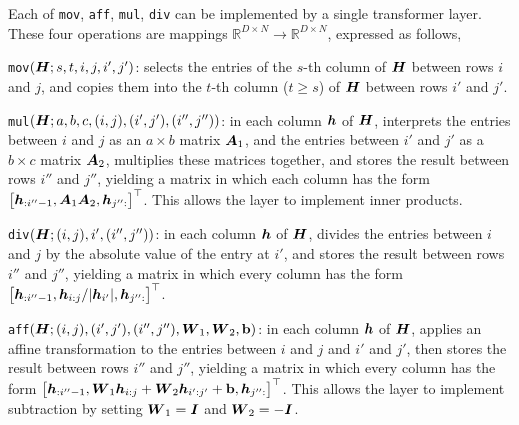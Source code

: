 \begin{proposition}\label{prop:akyrek}
    Each of \verb|mov|, \verb|aff|, \verb|mul|, \verb|div|  can be implemented by a single transformer layer. These four operations are mappings $\mathbb R^{D \times N} \rightarrow \mathbb R^{D \times N}$, expressed as follows, 

\verb|mov|$(\boldsymbol{H}; s, t, i, j, i', j')$: selects the entries of the $s$-th column of $\boldsymbol{H}$ between rows $i$ and $j$, and copies
them into the $t$-th column ($t \geq s$) of $\boldsymbol{H}$ between rows $i'$ and $j'$. 

\verb|mul|$(\boldsymbol{H}; a, b, c, (i, j), (i', j'), (i'', j''))$: in each column $\boldsymbol{h}$ of $\boldsymbol{H}$, interprets the entries between $i$ and $j$ as an $a \times b$ matrix $\boldsymbol{A}_1$, and the entries between $i'$ and $j'$ as a $b \times c$ matrix $\boldsymbol{A}_2$, multiplies these matrices together, and stores the result between rows $i''$ and $j''$, yielding a matrix in which each column has the form 
$\begin{bmatrix}
    \boldsymbol{h}_{:i''-1}, \boldsymbol{A}_1 \boldsymbol{A}_2, \boldsymbol{h}_{j'':}
\end{bmatrix}^\top$. This allows the layer to implement inner products. 

\verb|div|$(\boldsymbol{H}; (i, j), i', (i'', j''))$: in each column $\boldsymbol{h}$ of $\boldsymbol{H}$, divides the entries between $i$ and $j$ by the absolute value of the entry at $i'$, and stores the result between rows $i''$ and $j''$, yielding a matrix in which every column has the form $\begin{bmatrix}
    \boldsymbol{h}_{:i''-1}, \boldsymbol{h}_{i:j} / |\boldsymbol{h}_{i'}|, \boldsymbol{h}_{j'':}
\end{bmatrix}^\top$.

\verb|aff|$(\boldsymbol{H}; (i, j), (i', j'), (i'', j''), \boldsymbol{W}_1, \boldsymbol{W}_2, \mathbf{b})$: in each column $\boldsymbol{h}$ of $\boldsymbol{H}$, applies an affine transformation to the entries between $i$ and $j$ and $i'$ and $j'$, then stores the result between rows $i''$ and $j''$, yielding a matrix in which every column has the form $\begin{bmatrix}
    \boldsymbol{h}_{:i''-1}, \boldsymbol{W}_1 \boldsymbol{h}_{i:j} + \boldsymbol{W}_2 \boldsymbol{h}_{i':j'} + \mathbf{b}, \boldsymbol{h}_{j'':}
\end{bmatrix}^\top$. This allows the layer to implement subtraction by setting $\boldsymbol{W}_1 = \boldsymbol{I}$ and $\boldsymbol{W}_2 = -\boldsymbol{I}$.


\end{proposition}



